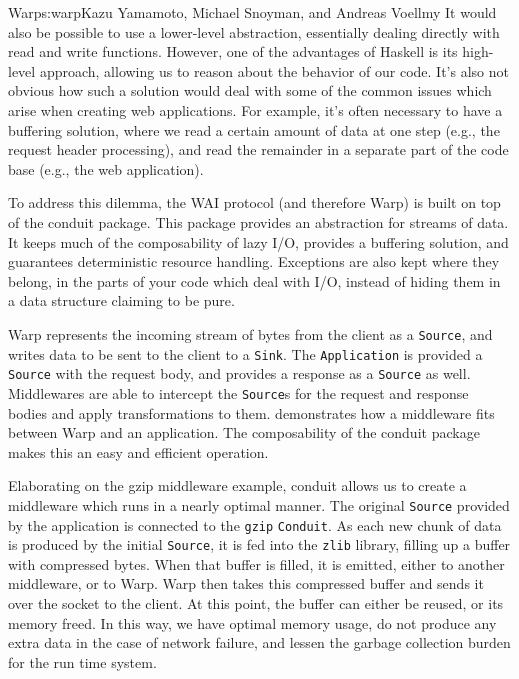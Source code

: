 \begin{aosachapter}{Warp}{s:warp}{Kazu Yamamoto, Michael Snoyman, and Andreas Voellmy}
It would also be possible to use a lower-level abstraction, essentially
dealing directly with read and write functions. However, one of the
advantages of Haskell is its high-level approach, allowing us to reason
about the behavior of our code. It's also not obvious how such a
solution would deal with some of the common issues which arise when
creating web applications. For example, it's often necessary to have a
buffering solution, where we read a certain amount of data at one step
(e.g., the request header processing), and read the remainder in a
separate part of the code base (e.g., the web application).

To address this dilemma, the WAI protocol (and therefore Warp) is built
on top of the conduit package. This package provides an abstraction for
streams of data. It keeps much of the composability of lazy I/O,
provides a buffering solution, and guarantees deterministic resource
handling. Exceptions are also kept where they belong, in the parts of
your code which deal with I/O, instead of hiding them in a data
structure claiming to be pure.

Warp represents the incoming stream of bytes from the client as a
\texttt{Source}, and writes data to be sent to the client to a
\texttt{Sink}. The \texttt{Application} is provided a \texttt{Source}
with the request body, and provides a response as a \texttt{Source} as
well. Middlewares are able to intercept the \texttt{Source}s for the
request and response bodies and apply transformations to them.
 demonstrates how a middleware fits
between Warp and an application. The composability of the conduit
package makes this an easy and efficient operation.


Elaborating on the gzip middleware example, conduit allows us to create
a middleware which runs in a nearly optimal manner. The original
\texttt{Source} provided by the application is connected to the
\texttt{gzip} \texttt{Conduit}. As each new chunk of data is produced by
the initial \texttt{Source}, it is fed into the \texttt{zlib} library,
filling up a buffer with compressed bytes. When that buffer is filled,
it is emitted, either to another middleware, or to Warp. Warp then takes
this compressed buffer and sends it over the socket to the client. At
this point, the buffer can either be reused, or its memory freed. In
this way, we have optimal memory usage, do not produce any extra data in
the case of network failure, and lessen the garbage collection burden
for the run time system.


\end{aosachapter}
